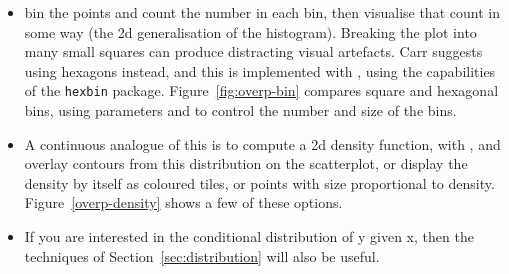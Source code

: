 \begin{itemize}
  \item bin the points and count the number in each bin, then visualise that count in some way (the 2d generalisation of the histogram).  Breaking the plot into many small squares can produce distracting visual artefacts.  Carr \citep{carr:1987} suggests using hexagons instead, and this is implemented with , using the capabilities of the {\tt hexbin} \cite{hexbin} package.  Figure~\ref{fig:overp-bin} compares square and hexagonal bins, using parameters  and  to control the number and size of the bins.
  
    
  
  \item A continuous analogue of this is to compute a 2d density function, with , and overlay contours from this distribution on the scatterplot, or display the density by itself as coloured tiles, or points with size proportional to density.  Figure~\ref{overp-density} shows a few of these options.
  
    
  
  \item If you are interested in the conditional distribution of y given x, then the techniques of Section~\ref{sec:distribution} will also be useful.
  
\end{itemize}

